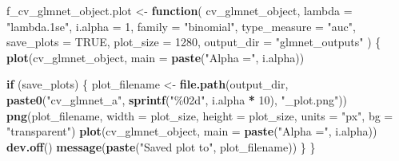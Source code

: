 \documentclass[
]{article}
\newenvironment{Shaded}{\begin{snugshade}}{\end{snugshade}}
\newcommand{\AttributeTok}[1]{\textcolor[rgb]{0.13,0.29,0.53}{#1}}
\newcommand{\ConstantTok}[1]{\textcolor[rgb]{0.56,0.35,0.01}{#1}}
\newcommand{\ControlFlowTok}[1]{\textcolor[rgb]{0.13,0.29,0.53}{\textbf{#1}}}
\newcommand{\DecValTok}[1]{\textcolor[rgb]{0.00,0.00,0.81}{#1}}
\newcommand{\FunctionTok}[1]{\textcolor[rgb]{0.13,0.29,0.53}{\textbf{#1}}}
\newcommand{\NormalTok}[1]{#1}
\newcommand{\OtherTok}[1]{\textcolor[rgb]{0.56,0.35,0.01}{#1}}
\newcommand{\SpecialCharTok}[1]{\textcolor[rgb]{0.81,0.36,0.00}{\textbf{#1}}}
\newcommand{\StringTok}[1]{\textcolor[rgb]{0.31,0.60,0.02}{#1}}
\begin{document}
\begin{Shaded}
\begin{Highlighting}[]
\NormalTok{f\_cv\_glmnet\_object.plot }\OtherTok{\textless{}{-}} \ControlFlowTok{function}\NormalTok{(}
\NormalTok{        cv\_glmnet\_object, }
        \AttributeTok{lambda =} \StringTok{"lambda.1se"}\NormalTok{, }
        \AttributeTok{i.alpha =} \DecValTok{1}\NormalTok{,}
        \AttributeTok{family =} \StringTok{"binomial"}\NormalTok{,}
        \AttributeTok{type\_measure =} \StringTok{"auc"}\NormalTok{,}
        \AttributeTok{save\_plots =} \ConstantTok{TRUE}\NormalTok{, }
        \AttributeTok{plot\_size =} \DecValTok{1280}\NormalTok{,}
        \AttributeTok{output\_dir =} \StringTok{"glmnet\_outputs"}
\NormalTok{) \{}
    \FunctionTok{plot}\NormalTok{(cv\_glmnet\_object, }\AttributeTok{main =} \FunctionTok{paste}\NormalTok{(}\StringTok{"Alpha ="}\NormalTok{, i.alpha))}
        
    \ControlFlowTok{if}\NormalTok{ (save\_plots) \{}
\NormalTok{        plot\_filename }\OtherTok{\textless{}{-}} \FunctionTok{file.path}\NormalTok{(output\_dir, }\FunctionTok{paste0}\NormalTok{(}\StringTok{"cv\_glmnet\_a"}\NormalTok{, }\FunctionTok{sprintf}\NormalTok{(}\StringTok{"\%02d"}\NormalTok{, i.alpha }\SpecialCharTok{*} \DecValTok{10}\NormalTok{), }\StringTok{"\_plot.png"}\NormalTok{))}
        \FunctionTok{png}\NormalTok{(plot\_filename, }\AttributeTok{width =}\NormalTok{ plot\_size, }\AttributeTok{height =}\NormalTok{ plot\_size, }\AttributeTok{units =} \StringTok{"px"}\NormalTok{, }\AttributeTok{bg =} \StringTok{"transparent"}\NormalTok{)}
        \FunctionTok{plot}\NormalTok{(cv\_glmnet\_object, }\AttributeTok{main =} \FunctionTok{paste}\NormalTok{(}\StringTok{"Alpha ="}\NormalTok{, i.alpha))}
        \FunctionTok{dev.off}\NormalTok{()}
        \FunctionTok{message}\NormalTok{(}\FunctionTok{paste}\NormalTok{(}\StringTok{"Saved plot to"}\NormalTok{, plot\_filename))}
\NormalTok{    \}}
\NormalTok{\}}



\end{Highlighting}
\end{Shaded}
\end{document}
